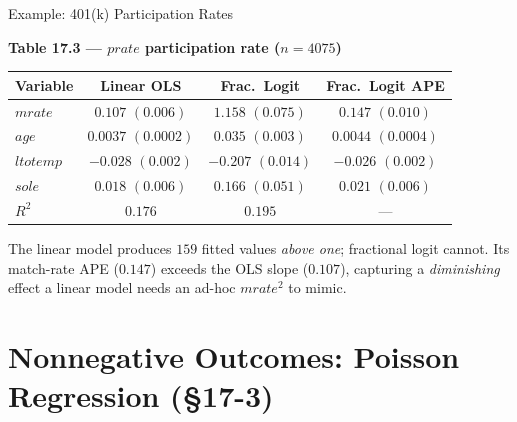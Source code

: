 \documentclass[aspectratio=169, 12pt]{beamer}
\begin{document}
\begin{frame}{Example: 401(k) Participation Rates}

  \begin{center}
    {\small\textbf{\textcolor{SUFEBlue}{Table 17.3 --- $prate$ participation rate ($n=4075$)}}}

    \smallskip
    \footnotesize
    \begin{tabular}{l c c c}
      \toprule
      Variable & Linear OLS & Frac.\ Logit & Frac.\ Logit APE \\
      \midrule
      $mrate$  & $0.107$ $(0.006)$  & $1.158$ $(0.075)$  & $0.147$ $(0.010)$ \\
      $age$    & $0.0037$ $(0.0002)$ & $0.035$ $(0.003)$ & $0.0044$ $(0.0004)$ \\
      $ltotemp$& $-0.028$ $(0.002)$ & $-0.207$ $(0.014)$ & $-0.026$ $(0.002)$ \\
      $sole$   & $0.018$ $(0.006)$  & $0.166$ $(0.051)$  & $0.021$ $(0.006)$ \\
      \midrule
      $R^2$    & $0.176$ & $0.195$ & --- \\
      \bottomrule
    \end{tabular}
  \end{center}

  \smallskip

  \begin{keybox}
    \small
    The linear model produces $159$ fitted values \emph{above one}; fractional
    logit cannot. Its match-rate APE ($0.147$) exceeds the OLS slope ($0.107$),
    capturing a \emph{diminishing} effect a linear model needs an ad-hoc
    $mrate^{2}$ to mimic.
  \end{keybox}

\end{frame}

\section{Nonnegative Outcomes: Poisson Regression (\S17-3)}
\end{document}
